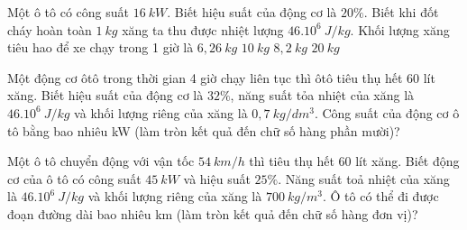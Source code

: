 \begin{ex} 
	Một ô tô có công suất $16\ kW$. Biết hiệu suất của động cơ là $20 \%$. Biết khi đốt cháy hoàn toàn $1 \ kg$ xăng ta thu được nhiệt lượng $46 . 10^{6} \ J / kg$. Khối lượng xăng tiêu hao để xe chạy trong 1 giờ là
	\choice
	{\True $6,26 \ kg$}
	{$10 \ kg$}
	{$8,2 \ kg$}
	{$20 \ kg$}
	\loigiai{
	}
\end{ex}
\begin{ex} 
	Một động cơ ôtô trong thời gian 4 giờ chạy liên tục thì ôtô tiêu thụ hết 60 lít xăng. Biết hiệu suất của động cơ là $32 \%$, năng suất tỏa nhiệt của xăng là $46.10^{6} \ J / kg$ và khối
	lượng riêng của xăng là $0,7 \ kg / dm^3$. Công suất của động cơ ô tô bằng bao nhiêu kW (làm tròn kết quả đến chữ số hàng phần mười)?
\end{ex} 
\begin{ex}%
	Một ô tô chuyển động với vận tốc $54\ km/h$ thì tiêu thụ hết $60$ lít xăng. Biết động cơ của ô tô có công suất $45\ kW$ và hiệu suất $25\%$. Năng suất toả nhiệt của xăng là $46.10^6\ J/kg$ và khối lượng riêng của xăng là $700\ kg/m^3$. Ô tô có thể đi được đoạn đường dài bao nhiêu km (làm tròn kết quả đến chữ số hàng đơn vị)?
	\end{ex}